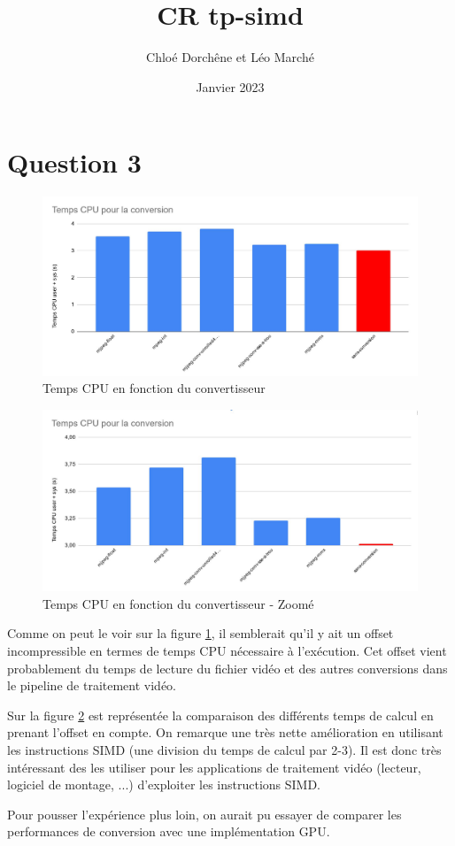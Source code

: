 \documentclass{article}
\title{CR tp-simd}
\author{Chloé Dorchêne et Léo Marché}
\date{Janvier 2023}
\begin{document}
\maketitle

\section{Question 3}

\begin{figure}[h]
    \centering
    \includegraphics[width=0.9\linewidth]{temps_cpu_conversion.JPG}
    \caption{Temps CPU en fonction du convertisseur}
    \label{fig:comparaison}
\end{figure}

\begin{figure}[h]
    \centering
    \includegraphics[width=0.9\linewidth]{temps_cpu_conversion_scaled.JPG}
    \caption{Temps CPU en fonction du convertisseur - Zoomé}
    \label{fig:comparaison2}
\end{figure}

Comme on peut le voir sur la figure \ref{fig:comparaison}, il semblerait qu'il y ait un offset incompressible en termes de temps CPU nécessaire à l'exécution. Cet offset vient probablement du temps de lecture du fichier vidéo et des autres conversions dans le pipeline de traitement vidéo.

Sur la figure \ref{fig:comparaison2} est représentée la comparaison des différents temps de calcul en prenant l'offset en compte. On remarque une très nette amélioration en utilisant les instructions SIMD (une division du temps de calcul par 2-3). Il est donc très intéressant des les utiliser pour les applications de traitement vidéo (lecteur, logiciel de montage, ...) d'exploiter les instructions SIMD.

Pour pousser l'expérience plus loin, on aurait pu essayer de comparer les performances de conversion avec une implémentation GPU.
\end{document}
